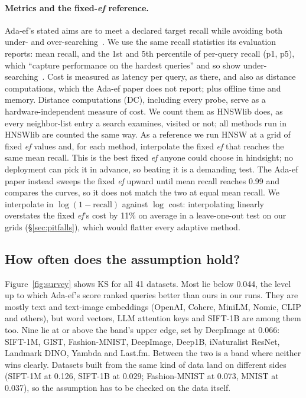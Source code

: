 \documentclass[sigconf,review=false,screen]{acmart}
\newcommand{\ef}{\textit{ef}}
\begin{document}
\paragraph{Metrics and the fixed-\ef{} reference.}
Ada-ef's stated aims are to meet a declared target recall while avoiding both under- and
over-searching~\cite{zhang2026adaef}. We use the same recall statistics its evaluation reports:
mean recall, and the 1st and 5th percentile of per-query recall (p1, p5), which ``capture
performance on the hardest queries'' and so show under-searching~\cite[\S 7.2]{zhang2026adaef}.
Cost is measured as latency per query, as there, and also as distance computations, which the
Ada-ef paper does not report; plus offline time and memory. Distance
computations (DC), including every probe, serve as a hardware-independent measure of cost. We count
them as HNSWlib does, as every neighbor-list entry a search examines, visited or not; all methods
run in HNSWlib are counted the same way. As a
reference we run HNSW at a grid of fixed \ef{} values and, for each method, interpolate the fixed
\ef{} that reaches the same mean recall. This is the best fixed \ef{} anyone could choose in
hindsight; no deployment can pick it in advance, so beating it is a demanding test. The Ada-ef
paper instead sweeps the fixed \ef{} upward until mean recall reaches 0.99 and compares the curves,
so it does not match the two at equal mean recall. We interpolate in $\log(1 - \text{recall})$ against $\log$ cost:
interpolating linearly overstates the fixed \ef{}'s cost by 11\% on average in a leave-one-out
test on our grids (\S\ref{sec:pitfalls}), which would flatter every adaptive method.

\begin{table}[t]
  \caption{Datasets, sorted by KS (200 queries). $\rho$: rank correlation between each score and
  the true per-query $\mathrm{ef}^*$ on the calibration set, settings P / R; the larger magnitude
  ranks queries better. A dash: the score is constant on the calibration queries.}
  \label{tab:datasets}
  \centering\footnotesize
  \resizebox{\linewidth}{!}{}
\end{table}

\subsection{How often does the assumption hold?}\label{sec:holds}

Figure~\ref{fig:survey} shows KS for all 41 datasets. Most lie below 0.044, the level up to which
Ada-ef's score ranked queries better than ours in our runs. They are mostly text and text-image
embeddings (OpenAI, Cohere, MiniLM, Nomic, CLIP and others), but word vectors, LLM attention keys
and SIFT-1B are among them too. Nine lie at or above the band's upper edge, set by DeepImage at
0.066: SIFT-1M, GIST, Fashion-MNIST, DeepImage, Deep1B, iNaturalist ResNet, Landmark DINO, Yambda
and Last.fm. Between the two is a band where neither wins clearly.
Datasets built from the same kind of data land on different sides (SIFT-1M at 0.126, SIFT-1B at
0.029; Fashion-MNIST at 0.073, MNIST at 0.037), so the assumption has to be checked on the data
itself.
\end{document}
